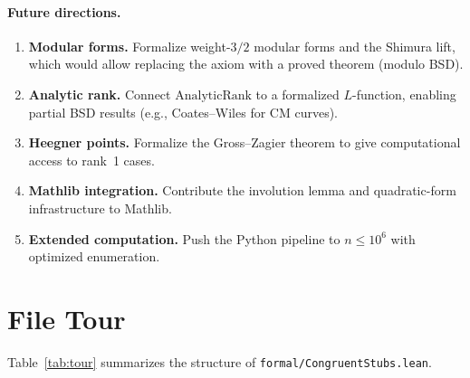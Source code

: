 \documentclass[11pt,a4paper]{article}
\theoremstyle{definition}
\begin{document}
\paragraph{Future directions.}
\begin{enumerate}[nosep]
  \item \textbf{Modular forms.}  Formalize weight-$3/2$ modular
    forms and the Shimura lift, which would allow replacing the
    axiom with a proved theorem (modulo BSD).
  \item \textbf{Analytic rank.}  Connect $\mathrm{AnalyticRank}$
    to a formalized $L$-function, enabling partial BSD results
    (e.g., Coates--Wiles for CM curves).
  \item \textbf{Heegner points.}  Formalize the Gross--Zagier
    theorem to give computational access to rank~1 cases.
  \item \textbf{Mathlib integration.}  Contribute the involution
    lemma and quadratic-form infrastructure to Mathlib.
  \item \textbf{Extended computation.}  Push the Python pipeline
    to $n \le 10^6$ with optimized enumeration.
\end{enumerate}

\appendix
\section{File Tour}\label{app:tour}

Table~\ref{tab:tour} summarizes the structure of
\texttt{formal/CongruentStubs.lean}.
\end{document}
